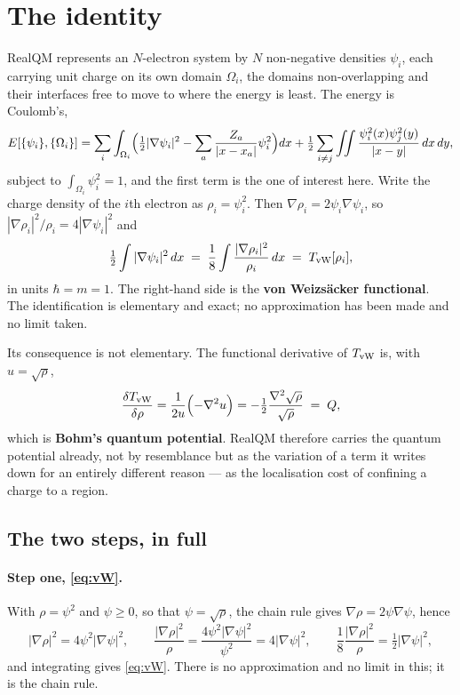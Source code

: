 \documentclass[11pt]{article}
\newcommand{\grad}{\nabla}
\newcommand{\half}{\tfrac12}
\begin{document}

\section{The identity}

RealQM \cite{realqm,realqmbook} represents an $N$-electron system by $N$ non-negative densities
$\psi_i$, each carrying unit charge on its own domain $\Omega_i$, the domains non-overlapping and
their interfaces free to move to where the energy is least. The energy is Coulomb's,
\begin{equation}\label{eq:E}
E[\{\psi_i\},\{\Omega_i\}]=\sum_i\int_{\Omega_i}\Bigl(\half|\grad\psi_i|^2
-\sum_a\frac{Z_a}{|x-x_a|}\psi_i^2\Bigr)dx
+\half\sum_{i\neq j}\iint\frac{\psi_i^2(x)\psi_j^2(y)}{|x-y|}\,dx\,dy,
\end{equation}
subject to $\int_{\Omega_i}\psi_i^2=1$, and the first term is the one of interest here. Write the
charge density of the $i$th electron as $\rho_i=\psi_i^2$. Then $\grad\rho_i=2\psi_i\grad\psi_i$, so
$|\grad\rho_i|^2/\rho_i=4|\grad\psi_i|^2$ and
\begin{equation}\label{eq:vW}
\half\int|\grad\psi_i|^2\,dx \;=\; \frac18\int\frac{|\grad\rho_i|^2}{\rho_i}\,dx
\;=\; T_{\rm vW}[\rho_i],
\end{equation}
in units $\hbar=m=1$. The right-hand side is the \textbf{von Weizs\"acker functional}. The
identification is elementary and exact; no approximation has been made and no limit taken.

Its consequence is not elementary. The functional derivative of $T_{\rm vW}$ is, with
$u=\sqrt{\rho}$,
\begin{equation}\label{eq:Q}
\frac{\delta T_{\rm vW}}{\delta\rho}
=\frac{1}{2u}\Bigl(-\grad^2u\Bigr)
=-\half\frac{\grad^2\sqrt{\rho}}{\sqrt{\rho}}
\;=\;Q,
\end{equation}
which is \textbf{Bohm's quantum potential}. RealQM therefore carries the quantum potential already,
not by resemblance but as the variation of a term it writes down for an entirely different reason ---
as the localisation cost of confining a charge to a region.

\subsection*{The two steps, in full}

\paragraph{Step one, \eqref{eq:vW}.} With $\rho=\psi^2$ and $\psi\ge0$, so that $\psi=\sqrt\rho$, the
chain rule gives $\grad\rho=2\psi\grad\psi$, hence
\[
|\grad\rho|^2=4\psi^2|\grad\psi|^2,\qquad
\frac{|\grad\rho|^2}{\rho}=\frac{4\psi^2|\grad\psi|^2}{\psi^2}=4|\grad\psi|^2,\qquad
\frac18\frac{|\grad\rho|^2}{\rho}=\half|\grad\psi|^2 ,
\]
and integrating gives \eqref{eq:vW}. There is no approximation and no limit in this; it is the chain
rule.
\end{document}
